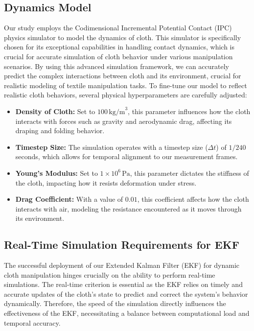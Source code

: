\documentclass[subscriptcorrection,upint,varvw,barcolor=Goldenrod3,mathalfa=cal=euler,balance,hyphenate,french,pdf-a, nofoot]{asmejour} %
\begin{document}
\subsection{Dynamics Model}
Our study employs the Codimensional Incremental Potential Contact (IPC) physics simulator to model the dynamics of cloth. This simulator is specifically chosen for its exceptional capabilities in handling contact dynamics, which is crucial for accurate simulation of cloth behavior under various manipulation scenarios. By using this advanced simulation framework, we can accurately predict the complex interactions between cloth and its environment, crucial for realistic modeling of textile manipulation tasks.
To fine-tune our model to reflect realistic cloth behaviors, several physical hyperparameters are carefully adjusted:
\begin{itemize}
    \item \textbf{Density of Cloth:} Set to \(100 \, \text{kg/m}^3\), this parameter influences how the cloth interacts with forces such as gravity and aerodynamic drag, affecting its draping and folding behavior.
    \item \textbf{Timestep Size:} The simulation operates with a timestep size (\(\Delta t\)) of \(1/240\) seconds, which allows for temporal alignment to our measurement frames.
    \item \textbf{Young's Modulus:} Set to \(1 \times 10^6 \, \text{Pa}\), this parameter dictates the stiffness of the cloth, impacting how it resists deformation under stress. 
    \item \textbf{Drag Coefficient:} With a value of \(0.01\), this coefficient affects how the cloth interacts with air, modeling the resistance encountered as it moves through its environment.
\end{itemize}

\subsection{Real-Time Simulation Requirements for EKF}

The successful deployment of our Extended Kalman Filter (EKF) for dynamic cloth manipulation hinges crucially on the ability to perform real-time simulations. The real-time criterion is essential as the EKF relies on timely and accurate updates of the cloth's state to predict and correct the system's behavior dynamically. Therefore, the speed of the simulation directly influences the effectiveness of the EKF, necessitating a balance between computational load and temporal accuracy.
\end{document}
